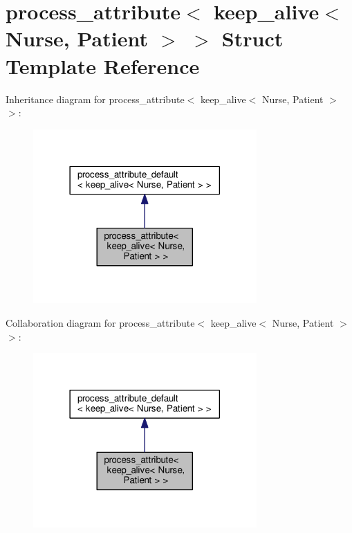 \hypertarget{structprocess__attribute_3_01keep__alive_3_01_nurse_00_01_patient_01_4_01_4}{}\section{process\+\_\+attribute$<$ keep\+\_\+alive$<$ Nurse, Patient $>$ $>$ Struct Template Reference}
\label{structprocess__attribute_3_01keep__alive_3_01_nurse_00_01_patient_01_4_01_4}


Inheritance diagram for process\+\_\+attribute$<$ keep\+\_\+alive$<$ Nurse, Patient $>$ $>$\+:
\nopagebreak
\begin{figure}[H]
\begin{center}
\leavevmode
\includegraphics[width=242pt]{structprocess__attribute_3_01keep__alive_3_01_nurse_00_01_patient_01_4_01_4__inherit__graph}
\end{center}
\end{figure}


Collaboration diagram for process\+\_\+attribute$<$ keep\+\_\+alive$<$ Nurse, Patient $>$ $>$\+:
\nopagebreak
\begin{figure}[H]
\begin{center}
\leavevmode
\includegraphics[width=242pt]{structprocess__attribute_3_01keep__alive_3_01_nurse_00_01_patient_01_4_01_4__coll__graph}
\end{center}
\end{figure}
